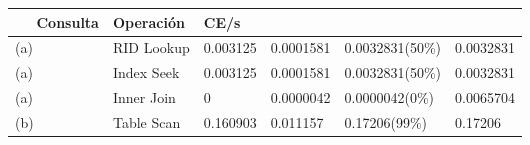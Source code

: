 
\begin{tabular}{| l | l | L | L | L | L |}
    \hline
    Consulta & Operación & CE/s &  &  &  \\ \hline
    (a) & RID Lookup & 0.003125 & 0.0001581 & 0.0032831(50\%) & 0.0032831 \\ \hline
    (a) & Index Seek & 0.003125 & 0.0001581 & 0.0032831(50\%) & 0.0032831 \\ \hline
    (a) & Inner Join & 0 & 0.0000042 & 0.0000042(0\%) & 0.0065704 \\ \hline
    (b) & Table Scan & 0.160903 & 0.011157 & 0.17206(99\%) & 0.17206 \\ \hline   
\end{tabular}

